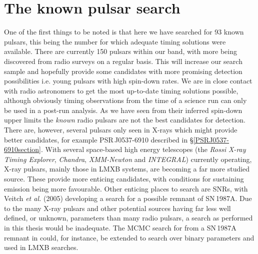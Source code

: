 \section{The known pulsar search}
One of the first things to be noted is that here we have searched for 93 known pulsars, this being
the number for which adequate timing solutions were available. There are currently 150 pulsars
within our band, with more being discovered from radio surveys on a regular basis. This will
increase our search sample and hopefully provide some candidates with more promising detection
possibilities i.e. young pulsars with high spin-down rates. We are in close contact with radio
astronomers to get the most up-to-date timing solutions possible, although obviously timing
observations from the time of a science run can only be used in a post-run analysis. As we have
seen from their inferred spin-down upper limits the {\it known} radio pulsars are not the best
candidates for \gw detection. There are, however, several pulsars only seen in X-rays which
might provide better candidates, for example PSR\,J0537-6910 described in
\S\ref{PSRJ0537-6910section}. With several space-based high energy telescopes (the {\it Rossi X-ray
Timing Explorer}, {\it Chandra}, {\it XMM-Newton} and {\it INTEGRAL}) currently operating, X-ray
pulsars, mainly those in LMXB systems, are becoming a far more studied source. These provide more
enticing candidates, with conditions for sustaining \gw emission being more favourable. Other
enticing places to search are SNRs, with Veitch {\it et al.} (2005) \cite{Veitch:2005} developing a
search for a possible remnant of SN\,1987A. Due to the many X-ray pulsars and other potential
sources having far less well defined, or unknown, parameters than many radio pulsars, a search as
performed in this thesis would be inadequate. The MCMC search for \gws from a SN\,1987A remnant in
\cite{Veitch:2005} could, for instance, be extended to search over binary parameters and used in
LMXB searches.


